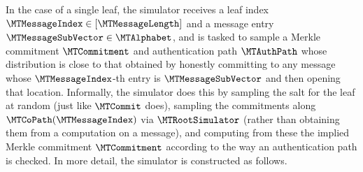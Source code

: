 In the case of a single leaf, the simulator receives a leaf index $\MTMessageIndex \in [\MTMessageLength]$ and a message entry $\MTMessageSubVector \in \MTAlphabet$, and is tasked to sample a Merkle commitment $\MTCommitment$ and authentication path $\MTAuthPath$ whose distribution is close to that obtained by honestly committing to any message whose $\MTMessageIndex$-th entry is $\MTMessageSubVector$ and then opening that location. Informally, the simulator does this by sampling the salt for the leaf at random (just like $\MTCommit$ does), sampling the commitments along $\MTCoPath(\MTMessageIndex)$ via $\MTRootSimulator$ (rather than obtaining them from a computation on a message), and computing from these the implied Merkle commitment $\MTCommitment$ according to the way an authentication path is checked. In more detail, the simulator is constructed as follows.

